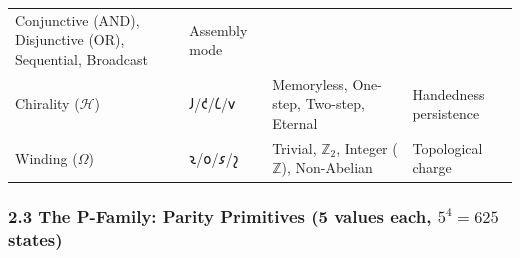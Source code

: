 \begin{longtable}[]{@{}llll@{}}
\begin{minipage}[t]{0.22\columnwidth}
Conjunctive (AND), Disjunctive (OR), Sequential, Broadcast\strut
\end{minipage} & \begin{minipage}[t]{0.17\columnwidth}\raggedright
Assembly mode\strut
\end{minipage}\tabularnewline
\begin{minipage}[t]{0.30\columnwidth}\raggedright
Chirality (\(\mathcal{H}\))\strut
\end{minipage} & \begin{minipage}[t]{0.19\columnwidth}\raggedright
𐑓/𐑒/𐑖/𐑫\strut
\end{minipage} & \begin{minipage}[t]{0.22\columnwidth}\raggedright
Memoryless, One-step, Two-step, Eternal\strut
\end{minipage} & \begin{minipage}[t]{0.17\columnwidth}\raggedright
Handedness persistence\strut
\end{minipage}\tabularnewline
\begin{minipage}[t]{0.30\columnwidth}\raggedright
Winding (\(\Omega\))\strut
\end{minipage} & \begin{minipage}[t]{0.19\columnwidth}\raggedright
𐑷/𐑴/𐑭/𐑟\strut
\end{minipage} & \begin{minipage}[t]{0.22\columnwidth}\raggedright
Trivial, \(\mathbb{Z}_2\), Integer (\(\mathbb{Z}\)), Non-Abelian\strut
\end{minipage} & \begin{minipage}[t]{0.17\columnwidth}\raggedright
Topological charge\strut
\end{minipage}\tabularnewline
\bottomrule
\end{longtable}

\hypertarget{the-p-family-parity-primitives-5-values-each-54-625-states}{%
\subsubsection{\texorpdfstring{2.3 The P-Family: Parity Primitives (5
values each, \(5^4 = 625\)
states)}{2.3 The P-Family: Parity Primitives (5 values each, 5\^{}4 = 625 states)}}\label{the-p-family-parity-primitives-5-values-each-54-625-states}}

